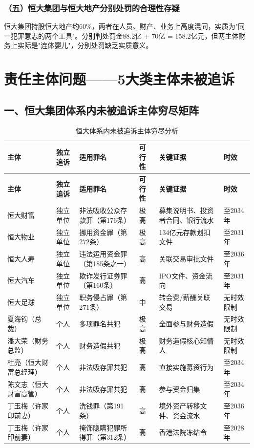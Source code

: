 \documentclass[11pt,a4paper,oneside,openany]{article}
\begin{document}
\subsubsection{（五）恒大集团与恒大地产分别处罚的合理性存疑}
恒大集团持股恒大地产约60\%，两者在人员、财产、业务上高度混同，实质为"同一犯罪意志的两个工具"。分别判处罚金88.2亿 + 70亿 = 158.2亿元，但两主体财务上实际是"连体婴儿"，分别处罚缺乏实质意义。

\section{责任主体问题——5大类主体未被追诉}

\subsection{一、恒大集团体系内未被追诉主体穷尽矩阵}
\begin{longtable}{p{2cm}p{1.3cm}p{2.8cm}p{1.3cm}p{3.5cm}p{1.3cm}}
\caption{恒大体系内未被追诉主体穷尽分析}\label{tab:unprosecuted}\\
\toprule
\textbf{主体} & \textbf{独立追诉} & \textbf{适用罪名} & \textbf{可行性} & \textbf{关键证据} & \textbf{时效} \\
\midrule
\endfirsthead
\toprule
\textbf{主体} & \textbf{独立追诉} & \textbf{适用罪名} & \textbf{可行性} & \textbf{关键证据} & \textbf{时效} \\
\midrule
\endhead
\bottomrule
\endlastfoot
恒大财富 & 独立单位 & 非法吸收公众存款罪（第176条） & \cellcolor{rowalt}极高 & 募集说明书、投资者合同、银行流水 & 至2034年 \\
恒大物业 & 独立单位 & 挪用资金罪（第272条） & \cellcolor{rowalt}极高 & 134亿元存款划扣文件 & 至2031年 \\
恒大人寿 & 独立单位 & 违法运用资金罪（第185条之一） & 高 & 关联交易审批文件 & 至2036年 \\
恒大汽车 & 独立单位 & 欺诈发行证券罪（第160条） & 高 & IPO文件、资金流向 & 至2031年 \\
恒大足球 & 独立单位 & 职务侵占罪（第271条） & 中 & 转会费/薪酬关联交易 & 无时效限制 \\
\midrule
夏海钧（总裁） & 个人 & 多项罪名共犯 & \cellcolor{rowalt}极高 & 全面参与财务造假 & 无时效限制 \\
潘大荣（财务总监） & 个人 & 财务造假共犯 & \cellcolor{rowalt}极高 & 财务造假核心知情人 & 无时效限制 \\
杜亮（恒大财富总经理） & 个人 & 非法吸存罪共犯 & 高 & 直接实施募资行为 & 至2034年 \\
陈文志（恒大财富高管） & 个人 & 非法吸存罪共犯 & 高 & 参与资金归集 & 至2034年 \\
\midrule
丁玉梅（许家印前妻） & 个人 & 洗钱罪（第191条） & \cellcolor{rowalt}高 & 境外资产转移文件、资金流水 & 至2036年 \\
丁玉梅（许家印前妻） & 个人 & 掩饰隐瞒犯罪所得罪（第312条） & 高 & 香港法院冻结令 & 至2028年 \\
\end{longtable}
\end{document}

